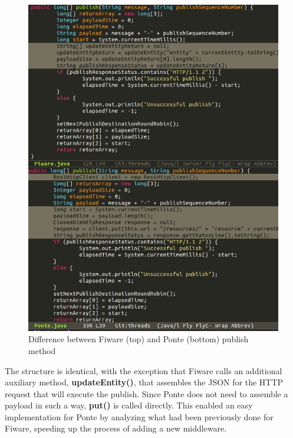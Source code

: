 \documentclass[conference]{IEEEtran}
\begin{document}
\begin{figure}[htbp!]
  \centering
  \includegraphics[width=\columnwidth]{figures/fiware_ponte_diff.png}
  \caption{Difference between Fiware (top) and Ponte (bottom) publish method}
  \label{fig:fiware_ponte_diff}
\end{figure}

The structure is identical, with the exception that Fiware calls an additional auxiliary method, \textbf{updateEntity()}, that assembles the JSON for the HTTP request that will execute the publish. Since Ponte does not need to assemble a payload in such a way, \textbf{put()} is called directly. This enabled an easy implementation for Ponte by analyzing what had been previously done for Fiware, speeding up the process of adding a new middleware.
\end{document}
